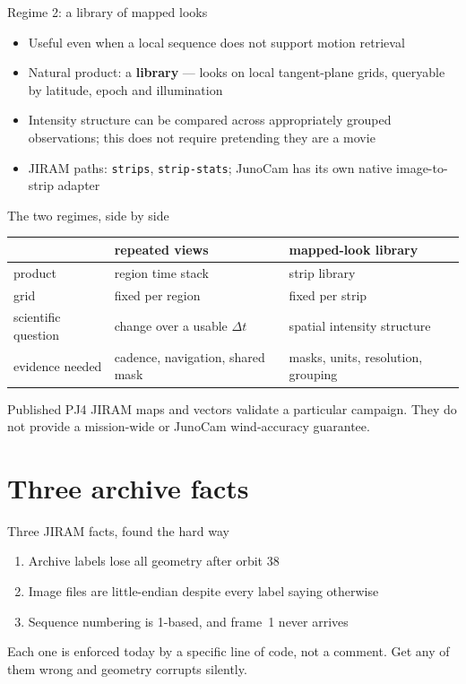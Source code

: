 \documentclass[aspectratio=169,11pt]{beamer}
\newcommand{\currevsec}{}
\newcommand{\revsec}[1]{\gdef\currevsec{#1}}
\begin{document}
\begin{frame}{Regime 2: a library of mapped looks}
  \revsec{1}
\begin{itemize}
    \item Useful even when a local sequence does not support motion retrieval
    \item Natural product: a \textbf{library} --- looks on local tangent-plane grids, queryable by latitude, epoch and illumination
    \item Intensity structure can be compared across appropriately grouped observations; this does not require pretending they are a movie
    \item JIRAM paths: \texttt{strips}, \texttt{strip-stats}; JunoCam has its own native image-to-strip adapter
  \end{itemize}
\end{frame}

\begin{frame}{The two regimes, side by side}
  \revsec{1}
\small
  \begin{tabular}{lll}
    \toprule
     & \textbf{repeated views} & \textbf{mapped-look library} \\
    \midrule
    product & region time stack & strip library \\
    grid & fixed per region & fixed per strip \\
    scientific question & change over a usable $\Delta t$ & spatial intensity structure \\
    evidence needed & cadence, navigation, shared mask & masks, units, resolution, grouping \\
    \bottomrule
  \end{tabular}\par
  \vspace{0.4cm}
  Published PJ4 JIRAM maps and vectors validate a particular campaign. They do not provide a mission-wide or JunoCam wind-accuracy guarantee.
\end{frame}

\section{Three archive facts}

\begin{frame}{Three JIRAM facts, found the hard way}
  \revsec{2}
  \begin{enumerate}
    \item Archive labels lose all geometry after orbit 38
    \item Image files are little-endian despite every label saying otherwise
    \item Sequence numbering is 1-based, and frame~1 never arrives
  \end{enumerate}
  \vspace{0.3cm}
  Each one is enforced today by a specific line of code, not a comment. Get any of them wrong and geometry corrupts silently.
\end{frame}
\end{document}
